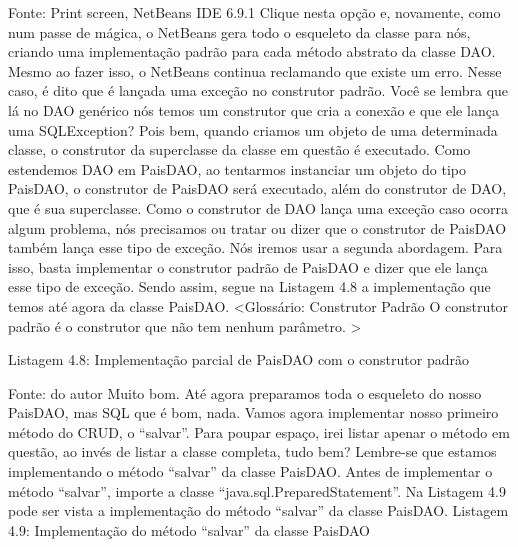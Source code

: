 Fonte: Print screen, NetBeans IDE 6.9.1
Clique nesta opção e, novamente, como num passe de mágica, o NetBeans gera todo o esqueleto da classe para nós, criando uma implementação padrão para cada método abstrato da classe DAO. Mesmo ao fazer isso, o NetBeans continua reclamando que existe um erro. Nesse caso, é dito que é lançada uma exceção no construtor padrão. Você se lembra que lá no DAO genérico nós temos um construtor que cria a conexão e que ele lança uma SQLException? Pois bem, quando criamos um objeto de uma determinada classe, o construtor da superclasse da classe em questão é executado. Como estendemos DAO em PaisDAO, ao tentarmos instanciar um objeto do tipo PaisDAO, o construtor de PaisDAO será executado, além do construtor de DAO, que é sua superclasse. Como o construtor de DAO lança uma exceção caso ocorra algum problema, nós precisamos ou tratar ou dizer que o construtor de PaisDAO também lança esse tipo de exceção. Nós iremos usar a segunda abordagem. Para isso, basta implementar o construtor padrão de PaisDAO e dizer que ele lança esse tipo de exceção. Sendo assim, segue na Listagem 4.8 a implementação que temos até agora da classe PaisDAO.
<Glossário: Construtor Padrão
O construtor padrão é o construtor que não tem nenhum parâmetro.
>


















Listagem 4.8: Implementação parcial de PaisDAO com o construtor padrão
 
Fonte: do autor
Muito bom. Até agora preparamos toda o esqueleto do nosso PaisDAO, mas SQL que é bom, nada. Vamos agora implementar nosso primeiro método do CRUD, o “salvar”. Para poupar espaço, irei listar apenar o método em questão, ao invés de listar a classe completa, tudo bem? Lembre-se que estamos implementando o método “salvar” da classe PaisDAO. Antes de implementar o método “salvar”, importe a classe “java.sql.PreparedStatement”. Na Listagem 4.9 pode ser vista a implementação do método “salvar” da classe PaisDAO.
Listagem 4.9: Implementação do método “salvar” da classe PaisDAO
 
